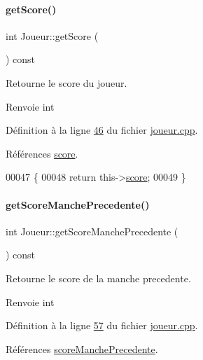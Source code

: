 \paragraph{\texorpdfstring{get\+Score()}{getScore()}}
{\footnotesize\ttfamily int Joueur\+::get\+Score (\begin{DoxyParamCaption}{ }\end{DoxyParamCaption}) const}



Retourne le score du joueur. 

\begin{DoxyReturn}{Renvoie}
int 
\end{DoxyReturn}


Définition à la ligne \hyperlink{joueur_8cpp_source_l00046}{46} du fichier \hyperlink{joueur_8cpp_source}{joueur.\+cpp}.



Références \hyperlink{joueur_8h_source_l00043}{score}.


\begin{DoxyCode}
00047 \{
00048     \textcolor{keywordflow}{return} this->\hyperlink{class_joueur_a680896b9ff71c2762ae653ef6aa7c8ce}{score};
00049 \}
\end{DoxyCode}
\mbox{\label{class_joueur_ade4640f21e0f3c30390bda7d25b748fa}} 
\paragraph{\texorpdfstring{get\+Score\+Manche\+Precedente()}{getScoreManchePrecedente()}}
{\footnotesize\ttfamily int Joueur\+::get\+Score\+Manche\+Precedente (\begin{DoxyParamCaption}{ }\end{DoxyParamCaption}) const}



Retourne le score de la manche precedente. 

\begin{DoxyReturn}{Renvoie}
int 
\end{DoxyReturn}


Définition à la ligne \hyperlink{joueur_8cpp_source_l00057}{57} du fichier \hyperlink{joueur_8cpp_source}{joueur.\+cpp}.



Références \hyperlink{joueur_8h_source_l00045}{score\+Manche\+Precedente}.


